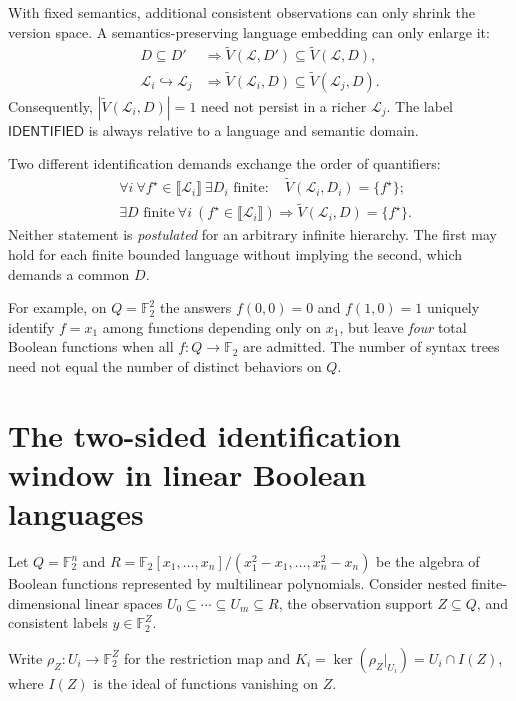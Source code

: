 \documentclass[11pt,a4paper]{article}
\newcommand{\F}{\mathbb{F}}
\newcommand{\sem}[1]{\llbracket #1\rrbracket}
\newcommand{\VS}{\widetilde V}
\newcommand{\vstatus}[1]{\textsf{#1}}
\begin{document}
With fixed semantics, additional consistent observations can only shrink the version space. A semantics-preserving language embedding can only enlarge it:
\begin{equation}\label{eq:monotonic}
\begin{aligned}
D\subseteq D'&\Longrightarrow\VS(\mathcal L,D')\subseteq\VS(\mathcal L,D),\\
\mathcal L_i\hookrightarrow\mathcal L_j&\Longrightarrow\VS(\mathcal L_i,D)\subseteq\VS(\mathcal L_j,D).
\end{aligned}
\end{equation}
Consequently, $|\VS(\mathcal L_i,D)|=1$ need not persist in a richer $\mathcal L_j$. The label $\vstatus{IDENTIFIED}$ is always relative to a language and semantic domain.

Two different identification demands exchange the order of quantifiers:
\begin{align}\label{eq:quantifiers}
&\forall i\ \forall f^\star\in\sem{\mathcal L_i}\ \exists D_i\text{ finite}:\quad
 \VS(\mathcal L_i,D_i)=\{f^\star\};\\
&\exists D\text{ finite}\ \forall i\ (f^\star\in\sem{\mathcal L_i})\Rightarrow
 \VS(\mathcal L_i,D)=\{f^\star\}.
\end{align}
Neither statement is \emph{postulated} for an arbitrary infinite hierarchy. The first may hold for each finite bounded language without implying the second, which demands a common $D$.

For example, on $Q=\F_2^2$ the answers $f(0,0)=0$ and $f(1,0)=1$ uniquely identify $f=x_1$ among functions depending only on $x_1$, but leave \emph{four} total Boolean functions when all $f:Q\to\F_2$ are admitted. The number of syntax trees need not equal the number of distinct behaviors on $Q$.

\section{The two-sided identification window in linear Boolean languages}

Let $Q=\F_2^n$ and $R=\F_2[x_1,\ldots,x_n]/(x_1^2-x_1,\ldots,x_n^2-x_n)$ be the algebra of Boolean functions represented by multilinear polynomials. Consider nested finite-dimensional linear spaces $U_0\subseteq\cdots\subseteq U_m\subseteq R$, the observation support $Z\subseteq Q$, and consistent labels $y\in\F_2^Z$.

Write $\rho_Z:U_i\to\F_2^Z$ for the restriction map and $K_i=\ker(\rho_Z|_{U_i})=U_i\cap I(Z)$, where $I(Z)$ is the ideal of functions vanishing on $Z$.
\end{document}
